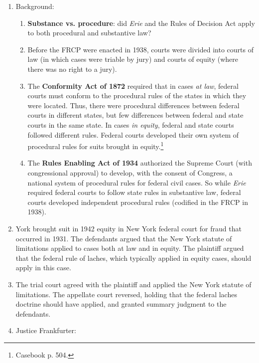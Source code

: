 \begin{enumerate}
    \item Background:
    \begin{enumerate}
        \item \textbf{Substance vs. procedure}: did \emph{Erie} and the Rules 
        of Decision Act apply to both procedural and substantive law?
        \item Before the FRCP were enacted in 1938, courts were divided into 
        courts of law (in which cases were triable by jury) and courts of 
        equity (where there was no right to a jury).
        \item The \textbf{Conformity Act of 1872} required that in cases 
        \emph{at law}, federal courts must conform to the procedural rules of 
        the states in which they were located. Thus, there were procedural 
        differences between federal courts in different states, but few 
        differences between federal and state courts in the same state. In 
        cases \emph{in equity}, federal and state courts followed different 
        rules. Federal courts developed their own system of procedural rules 
        for suits brought in equity.\footnote{Casebook p.  504.}
        \item The \textbf{Rules Enabling Act of 1934} authorized the Supreme 
        Court (with congressional approval) to develop, with the consent of 
        Congress, a national system of procedural rules for federal civil 
        cases. So while \emph{Erie} required federal courts to follow state 
        rules in substantive law, federal courts developed independent 
        procedural rules (codified in the FRCP in 1938).
    \end{enumerate}
    \item York brought suit in 1942 equity in New York federal court for fraud 
    that occurred in 1931. The defendants argued that the New York statute of 
    limitations applied to cases both at law and in equity. The plaintiff 
    argued that the federal rule of laches, which typically applied in equity 
    cases, should apply in this case.
    \item The trial court agreed with the plaintiff and applied the New York 
    statute of limitations. The appellate court reversed, holding that the 
    federal laches doctrine should have applied, and granted summary judgment 
    to the defendants.
    \item Justice Frankfurter:
    \begin{enumerate}

\end{enumerate}
\end{enumerate}
